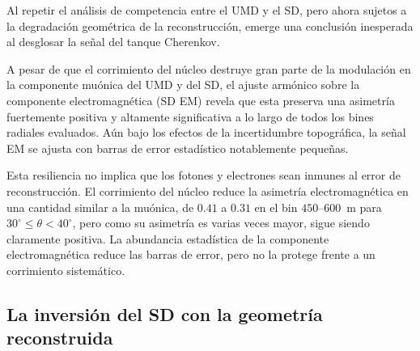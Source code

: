 Al repetir el análisis de competencia entre el UMD y el SD, pero ahora sujetos a la degradación geométrica de la reconstrucción, emerge una conclusión inesperada al desglosar la señal del tanque Cherenkov.

{\color{blue}A pesar de que el corrimiento del núcleo} destruye gran parte de la modulación en la componente muónica del UMD y del SD, el ajuste armónico sobre la componente electromagnética (SD EM) revela que esta preserva una asimetría fuertemente positiva y altamente significativa a lo largo de todos los bines radiales evaluados. Aún bajo los efectos de la incertidumbre topográfica, la señal EM se ajusta con barras de error estadístico notablemente pequeñas.

{\color{blue}Esta resiliencia no implica que los fotones y electrones sean inmunes al error de reconstrucción. El corrimiento del núcleo reduce la asimetría electromagnética en una cantidad similar a la muónica, de $0.41$ a $0.31$ en el bin $450$--$600$~m para $30^\circ \leq \theta < 40^\circ$, pero como su asimetría es varias veces mayor, sigue siendo claramente positiva. La abundancia estadística de la componente electromagnética reduce las barras de error, pero no la protege frente a un corrimiento sistemático.}

{\color{blue}\subsection{La inversión del SD con la geometría reconstruida}
\label{subsec:inversion_sd_rec}}

